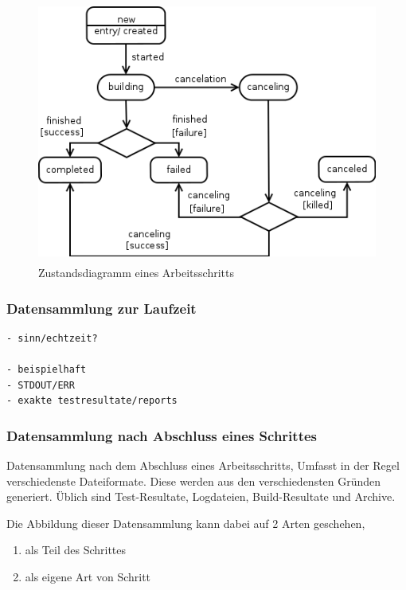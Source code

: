 \begin{figure}[ht] 
    \centering
    \includegraphics[height=3.4in]{imageinput/lebenszyklus-arbeitsschritt.png}
    \caption{Zustandsdiagramm eines Arbeitsschritts}
    \label{fig:lebenszyklus-arbeitsschritt}
\end{figure}


\subsubsection{Datensammlung zur Laufzeit}

\begin{verbatim}
- sinn/echtzeit?

- beispielhaft
- STDOUT/ERR
- exakte testresultate/reports
\end{verbatim}



\subsubsection{Datensammlung nach Abschluss eines Schrittes}

Datensammlung nach dem Abschluss eines Arbeitsschritts,
Umfasst in der Regel verschiedenste Dateiformate.
Diese werden aus den verschiedensten Gründen generiert.
Üblich sind Test-Resultate, Logdateien, Build-Resultate und Archive.

Die Abbildung dieser Datensammlung kann dabei auf 2 Arten geschehen,

\begin{enumerate}
    \item als Teil des Schrittes
    \item als eigene Art von Schritt
\end{enumerate}

